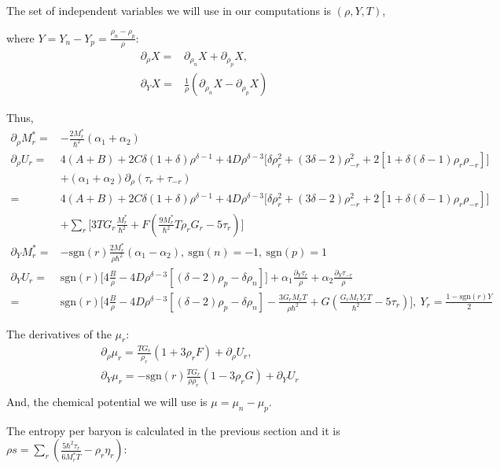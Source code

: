 \documentclass[preprint,prc,preprintnumbers,superscriptaddress,amsmath,amssymb,floatfix]{revtex4-1}
\begin{document}
The set of independent variables we will use in our computations is $(\rho,Y,T)$,

where $Y= Y_n-Y_p =\frac{\rho_n-\rho_p}{\rho}$:
\begin{equation}
 \begin{split}
  \partial_{\rho}X =& \partial_{\rho_n}X + \partial_{\rho_p}X, \\
  \partial_{Y}X=& \frac{1}{\rho} (\partial_{\rho_n}X - \partial_{\rho_p}X)
 \end{split}
\end{equation}

Thus,
\begin{equation}
 \begin{split}
  \partial_{\rho}M^{*}_r=&-\frac{2M_r^{*}}{\hbar^2}(\alpha_1+\alpha_2)\\
  \partial_{\rho}U_r=&4 (A+B)+2 C \delta(1+\delta)\rho^{\delta-1}+4D\rho^{\delta-3}\big[\delta \rho_r^2+(3\delta-2)\rho_{-r}^2+2[1+\delta(\delta-1)\rho_r\rho_{-r}]\big]\\
  &+(\alpha_1+\alpha_2)\partial_{\rho}(\tau_r+\tau_{-r})\\
  =&4 (A+B)+2 C \delta(1+\delta)\rho^{\delta-1}+4D\rho^{\delta-3}\big[\delta \rho_r^2+(3\delta-2)\rho_{-r}^2+2[1+\delta(\delta-1)\rho_r\rho_{-r}]\big]\\
  &+\sum_r\big[3TG_r\frac{M_r^{*}}{\hbar^2}+F(\frac{9M_r^{*}}{\hbar^2}T\rho_rG_r-5\tau_r)\big]\\
  \partial_{Y}M^{*}_r=&-\text{sgn}(r)\frac{2M_r^{*}}{\rho \hbar^2}(\alpha_1-\alpha_2),\ \text{sgn}(n)=-1,\ \text{sgn}(p)=1\\
  \partial_Y U_r=& \text{sgn}(r)\big[4 \frac{B}{\rho}-4D \rho^{\delta-3}[(\delta-2)\rho_p-\delta \rho_n]\big]+\alpha_1\frac{\partial_Y\tau_r}{\rho}+\alpha_2\frac{\partial_Y\tau_{-r}}{\rho}\\
  =&\text{sgn}(r)\big[4 \frac{B}{\rho}-4D \rho^{\delta-3}[(\delta-2)\rho_p-\delta \rho_n]-\frac{3 G_r M_r T}{\rho \hbar^2}+G(\frac{G_r M_r Y_r T}{ \hbar^2}-5\tau_r)\big],\ Y_r = \frac{1-\text{sgn}(r)Y}{2}
 \end{split}
\end{equation}

The derivatives of the $\mu_r$:
\begin{equation}
 \begin{split}
  \partial_{\rho}\mu_r=\frac{TG_r}{\rho_r}(1+ 3\rho_r F)+\partial_{\rho}U_r,\\
  \partial_{Y}\mu_r=-\text{sgn}(r)\frac{TG_r}{\rho \rho_r}(1-3\rho_r G)+\partial_{Y}U_r&\\
 \end{split}
\end{equation}
And, the chemical potential we will use is $\mu = \mu_n-\mu_p$.

The entropy per baryon is calculated in the previous section and it is $\rho s=\sum_r(\frac{5 \hbar^2\tau_r}{6M_r^{*}T}-\rho_r \eta_r)$:
  
\end{document}
